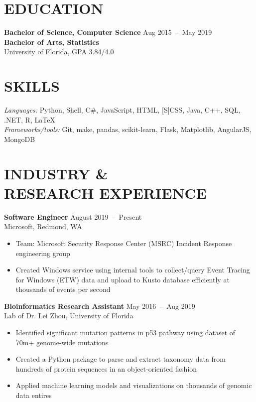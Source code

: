 \documentclass[line,resmargin]{res}
\begin{document}
\address{\href{mailto:victor@victorl.in}{victor@victorl.in} $|$
         \href{https://victorl.in/}{https://victorl.in/}}

\begin{resume}

\section{EDUCATION}
    \textbf{Bachelor of Science, Computer Science}    \hfill Aug 2015~--~May 2019 \\
    \textbf{Bachelor of Arts, Statistics} \\
    University of Florida, GPA 3.84/4.0

\section{SKILLS}
    {\sl Languages:} Python, Shell, C\#, JavaScript, HTML, [S]CSS, Java, C++, SQL, .NET, R, LaTeX \\
    {\sl Frameworks/tools:} Git, make, pandas, scikit-learn, Flask, Matplotlib, AngularJS, MongoDB

\section{INDUSTRY \& \\ RESEARCH EXPERIENCE}
    \textbf{Software Engineer}    \hfill August 2019~--~Present \\
    Microsoft, Redmond, WA
    \begin{itemize}  \itemsep -2pt
        \item Team: Microsoft Security Response Center (MSRC) Incident Response engineering group
        \item Created Windows service using internal tools to collect/query Event Tracing for Windows (ETW) data and upload to Kusto database efficiently at thousands of events per second
    \end{itemize}

    \textbf{Bioinformatics Research Assistant}    \hfill May 2016~--~Aug 2019 \\
    Lab of Dr. Lei Zhou, University of Florida
    \begin{itemize}  \itemsep -2pt
        \item Identified significant mutation patterns in p53 pathway using dataset of 70m+ genome-wide mutations
        \item Created a Python package to parse and extract taxonomy data from hundreds of protein sequences in an object-oriented fashion
        \item Applied machine learning models and visualizations on thousands of genomic data entires
    \end{itemize}


\end{resume}
\end{document}
